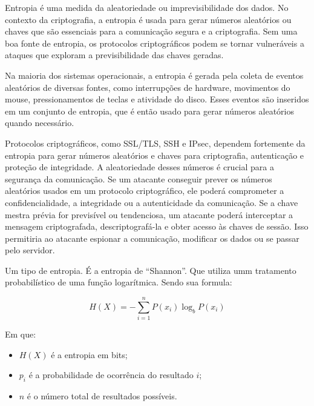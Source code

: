         Entropia é uma medida da aleatoriedade ou imprevisibilidade dos dados. 
        No contexto da criptografia, a entropia é usada para gerar 
        números aleatórios ou chaves que são essenciais para a comunicação segura e a criptografia. 
        Sem uma boa fonte de entropia, os protocolos criptográficos podem se tornar vulneráveis a ataques 
        que exploram a previsibilidade das chaves geradas.

        Na maioria dos sistemas operacionais, 
        a entropia é gerada pela coleta de eventos aleatórios de diversas fontes, 
        como interrupções de hardware, movimentos do mouse, 
        pressionamentos de teclas e atividade do disco. 
        Esses eventos são inseridos em um conjunto de entropia, 
        que é então usado para gerar números aleatórios quando necessário.

        Protocolos criptográficos, como SSL/TLS, SSH e IPsec, 
        dependem fortemente da entropia para gerar números aleatórios e chaves para criptografia, 
        autenticação e proteção de integridade.
        A aleatoriedade desses números é crucial para a segurança da comunicação. 
        Se um atacante conseguir prever os números aleatórios usados em um protocolo criptográfico, 
        ele poderá comprometer a confidencialidade, a integridade ou a autenticidade da comunicação.
        Se a chave mestra prévia for previsível ou tendenciosa, 
        um atacante poderá interceptar a mensagem criptografada, 
        descriptografá-la e obter acesso às chaves de sessão. 
        Isso permitiria ao atacante espionar a comunicação, 
        modificar os dados ou se passar pelo servidor.\nocite{6.2Entropia}

        Um tipo de entropia. É a entropia de ``Shannon''. Que utiliza umm tratamento probabilístico
        de uma função logarítmica.\nocite{6.2shannonEntropia} Sendo sua formula:

        \begin{equation}
            H(X) = - \sum_{i=1}^{n} P(x_i) \log_b P(x_i)
            \label{eq:shannon_entropy}
        \end{equation}

        Em que:
        \begin{itemize}
            \item $H(X)$ é a entropia em bits;
            \item $p_i$ é a probabilidade de ocorrência do resultado $i$;
            \item $n$ é o número total de resultados possíveis.
        \end{itemize}

